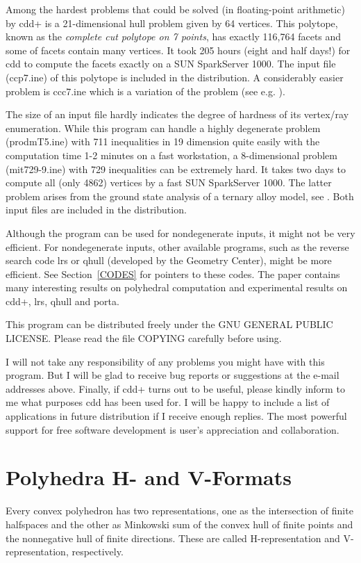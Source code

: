 \documentclass[11pt]{article}
\begin{document}
Among the hardest problems that could be
solved (in floating-point arithmetic) by cdd+ is a 
21-dimensional hull problem given by 64 
vertices. This polytope, known as the {\em complete
cut polytope on 7 points\/}, has exactly 116,764 facets
and some of facets contain many vertices. 
It took 205 hours (eight and half days!) for cdd
to compute the facets exactly on a SUN SparkServer 1000.
The input file (ccp7.ine) of this polytope is
included in the distribution.  A considerably easier
problem is ccc7.ine which is a variation of the problem 
(see e.g. \cite{g-afccn-90}).

The size of an input file hardly indicates the degree of 
hardness of its vertex/ray enumeration.  While this program
can handle a highly degenerate problem (prodmT5.ine) with 
711 inequalities in  19 dimension quite easily with
the computation time 1-2 minutes on a fast workstation, 
a 8-dimensional problem (mit729-9.ine) with 729 inequalities
can be extremely hard.  It takes two days to compute all
(only 4862) vertices by a fast SUN SparkServer 1000.  The latter problem arises
from the ground state analysis of a ternary alloy model, see \cite{cgaf-gstfl-94}.
Both input files are included in the distribution.  

Although the program can be used for nondegenerate inputs,
it might not be very efficient.  For nondegenerate inputs, 
other available programs, such as the reverse search code lrs or
qhull (developed by the Geometry Center),
might be more efficient.  See Section~\ref{CODES} 
for pointers to these codes.  
The paper \cite{abs-hgach-95} contains many interesting results on polyhedral
computation and experimental results on cdd+, lrs, qhull and porta.

This program can be distributed freely under the GNU GENERAL PUBLIC LICENSE.
Please read the file COPYING carefully before using.

I will not take any responsibility of any problems you might have
with this program.  But I will be glad to receive bug reports or suggestions
at the e-mail addresses above.  Finally, if cdd+ turns out to be useful, 
please kindly inform to me  what purposes cdd has been used for. 
I will be happy to include a list of applications in future
distribution  if I receive  enough replies.
The most powerful support for free software development
is user's appreciation and collaboration.

\section{Polyhedra H- and V-Formats} \label{FORMAT}
\bigskip
Every convex polyhedron has two representations, one as
the intersection of finite halfspaces and the other
as Minkowski sum of the convex hull of finite points
and the nonnegative hull of finite directions.  These are
called H-representation and V-representation, respectively.
\end{document}
